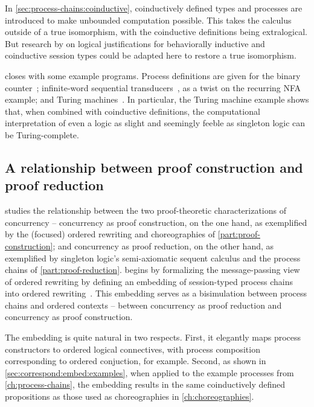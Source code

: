 In \cref{sec:process-chains:coinductive}, coinductively defined types and processes are introduced to make unbounded computation possible.
This takes the calculus outside of a true isomorphism, with the coinductive definitions being extralogical.
But research by \textcites{Derakhshan+Pfenning:LMCS20}{Somayyajula+Pfenning:20} on logical justifications for behaviorally inductive and coinductive session types could be adapted here to restore a true isomorphism.

 closes with some example programs.
Process definitions are given for the binary counter~; infinite-word sequential transducers~, as a twist on the recurring \acs*{NFA} example; and Turing machines~.
In particular, the Turing machine example shows that, when combined with coinductive definitions, the computational interpretation of even a logic as slight and seemingly feeble as singleton logic can be Turing-complete.

\subsection{A relationship between proof construction and proof reduction}

 studies the relationship between the two proof-theoretic characterizations of concurrency -- concurrency as proof construction, on the one hand, as exemplified by the (focused) ordered rewriting and choreographies of \cref{part:proof-construction}; and concurrency as proof reduction,  on the other hand, as exemplified by singleton logic's semi-axiomatic sequent calculus and the process chains of \cref{part:proof-reduction}.
 begins by formalizing the message-passing view of ordered rewriting by defining an embedding of session-typed process chains into ordered rewriting~.
This embedding serves as a bisimulation between process chains and ordered contexts -- between concurrency as proof reduction and concurrency as proof construction.

The embedding is quite natural in two respects.  
First, it elegantly maps process constructors to ordered logical connectives, with process composition corresponding to ordered conjuction, for example.
Second, as shown in \cref{sec:correspond:embed:examples}, when applied to the example processes from \cref{ch:process-chains}, the embedding results in the same coinductively defined propositions as those used as choreographies in \cref{ch:choreographies}.

